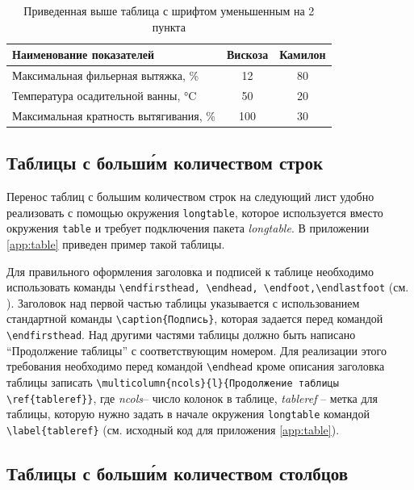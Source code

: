 \begin{table}[h]
\caption{Приведенная выше таблица с шрифтом уменьшенным на 2 пункта}
\label{tab:2}
\begin{center}
\begin{tabular}{|>{\small}l|>{\small}c|>{\small}c|}
\hline
Наименование показателей & Вискоза & Камилон \\
\hline
Максимальная фильерная вытяжка, \% &12 &80\\
\hline
Температура осадительной ванны, \si{\celsius} &50 &20\\
\hline
Максимальная кратность вытягивания, \% &100 &30\\
\hline
\end{tabular}
\end{center}
\end{table}

\subsection{Таблицы с больш\'{и}м количеством строк}
\label{sec:ltable}

Перенос таблиц с большим количеством строк на следующий лист удобно реализовать
с помощью окружения \verb|longtable|, которое используется вместо окружения
\verb|table| и требует подключения пакета {\itshape longtable}. В приложении
\ref{app:table} приведен пример такой таблицы.

Для правильного оформления заголовка и подписей к таблице необходимо использовать команды \verb|\endfirsthead, \endhead, \endfoot,\endlastfoot| (см. \cite[раздел 12.5]{Kotelnikov}). Заголовок над первой частью таблицы указывается с использованием стандартной команды \verb|\caption{Подпись}|, которая задается перед командой \verb|\endfirsthead|. Над другими частями таблицы должно быть написано ``Продолжение таблицы'' с соответствующим номером. Для реализации этого требования необходимо перед командой \verb|\endhead| кроме описания заголовка таблицы записать \verb|\multicolumn{ncols}{l}{Продолжение таблицы \ref{tableref}}|, где {\itshape ncols}-- число колонок в таблице, {\itshape tableref} -- метка для таблицы, которую нужно задать в начале окружения \verb|longtable| командой \verb|\label{tableref}| (см. исходный код для приложения \ref{app:table}).

\subsection{Таблицы с больш\'{и}м количеством столбцов}
\label{sec:gtable}

